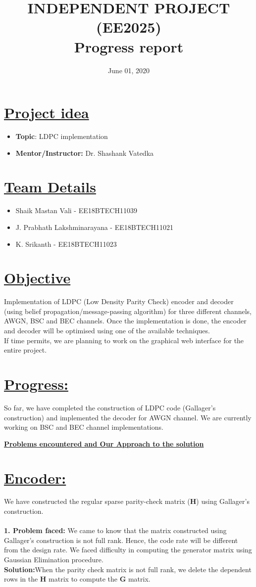 \documentclass[12pt]{extarticle}
\title{INDEPENDENT PROJECT (EE2025) \\ Progress report}
\date{June 01, 2020}
\newcommand{\<}{\langle}
\renewcommand{\>}{\rangle}
\theoremstyle{definition}
\begin{document}
\maketitle
\section{\underline{Project idea}}
\begin{itemize}
    \item \textbf{Topic}:\;  \;LDPC implementation 
    \item \textbf{Mentor/Instructor:} Dr. Shashank Vatedka
\end{itemize}
\section{\underline{Team Details}}
\begin{itemize}
    \item Shaik Mastan Vali - EE18BTECH11039
    \item J. Prabhath Lakshminarayana - EE18BTECH11021
    \item K. Srikanth - EE18BTECH11023
\end{itemize}
\section{\underline{Objective}}
Implementation of LDPC (Low Density Parity Check) encoder and decoder (using belief propagation/message-passing algorithm) for three different channels, AWGN, BSC and BEC channels. Once the implementation is done, the encoder and decoder will be optimised using one of the available techniques. \\
If time permits, we are planning to work on the graphical web interface for the entire project.
\section{\underline{Progress:}}
So far, we have completed the construction of LDPC code (Gallager’s construction) and implemented the decoder for AWGN channel. We are currently working on BSC and BEC channel implementations.
\newpage
\begin{center}
    \large{\textbf{\underline{Problems encountered and Our Approach to the solution
}}}
\end{center}
\section{\underline{Encoder:}}
We have constructed the regular sparse parity-check matrix (\textbf{H}) using Gallager’s construction. \\
\\
 \textbf{{1. Problem faced:}}  We came to know that the matrix constructed using Gallager’s construction is not full rank. Hence, the code rate will be different from the design rate. We faced difficulty in computing the generator matrix using Gaussian Elimination procedure. \\
\;\;\;\textbf{{Solution:}}When the parity check matrix is not full rank, we delete the dependent rows in the \textbf{H} matrix to compute the \textbf{G} matrix.
\\
\end{document}
